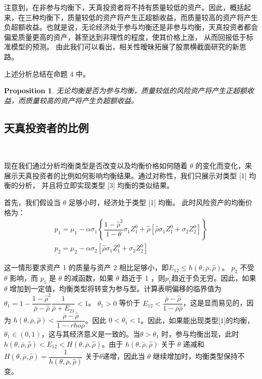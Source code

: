 \documentclass[10.0pt]{article}
\newtheorem{prop}{Proposition}
\begin{document}
注意到，在非参与均衡下，天真投资者将不持有质量较低的资产。因此，概括起来，在三种均衡下，质量较低的资产将产生正超额收益，而质量较高的资产将产生负超额收益。也就是说，无论经济处于参与均衡还是非参与均衡，天真投资者都会偏爱质量更高的资产，甚至达到非理性的程度，使其价格上涨， 从而回报低于标准模型的预测。 由此我们可以看出，相关性暧昧拓展了股票横截面研究的新思路。

上述分析总结在命题 4 中。
\begin{prop}
无论均衡是否为参与均衡，质量较低的风险资产将产生正超额收益，而质量较高的资产将产生负超额收益。
\end{prop}

\subsection{天真投资者的比例}

\quad \ 


现在我们通过分析均衡类型是否改变以及均衡价格如何随着 $ \theta $ 的变化而变化，来展示天真投资者的比例如何影响均衡结果。通过对称性，我们只展示对类型 [1] 均衡的分析， 并且将立即实现类型 [3] 均衡的类似结果。



首先，我们假设当 $ \theta $ 足够小时，经济处于类型 [1] 均衡。 此时风险资产的均衡价格为：
\begin{eqnarray*}
& p_1 = \mu_1 - \alpha \sigma_1 \left\{ \dfrac{1 - {\hat \rho}^2}{1 - \theta} \sigma_1 Z_1^0 + {\hat \rho} \left[ {\hat \rho} \sigma_1 Z_1^0 + \sigma_2 Z_2^0 \right] \right\} & \\
& p_2 = \mu_2 - \alpha \sigma_2 \left[ {\hat \rho} \sigma_1 Z_1^0 + \sigma_2 Z_2^0 \right] &
\end{eqnarray*}


这一情形要求资产 1 的质量与资产 2 相比足够小，即$ E_{1 2} \leqslant h (\theta, \overline{\rho}, {\hat \rho}) $。 $ p_2 $ 不受 $ \theta $ 影响，而 $ p_1 $ 是 $ \theta $ 的减函数，如果 $ \theta $ 趋近于 1 ，则$p_1$趋近于负无穷。因此，如果 $ \theta $ 增加到一定值，均衡类型将转变为参与型。计算表明偏移的临界值为 $ \theta_1 = 1 - \dfrac{1 - {\hat \rho}^2}{\overline{\rho} - {\hat \rho}} \dfrac{1 }{{\hat \rho} + E_{2 1}} < 1 $。 $ \theta_1 > 0 $ 等价于 $ E_{1 2} < \dfrac{\overline{\rho} - {\hat \rho}}{1 - \overline{\rho} {\hat \rho}} $，这是显而易见的，因为 $ h (\theta, \overline{\rho}, {\hat \rho}) < \dfrac{\overline{\rho} - {\hat \rho}}{1 - {\hat \ rho} \overline{\rho}} $。因此 $ 0 < \theta_1 < 1 $。因此，如果能出现类型[1]的均衡，$\theta_1\in(0, 1)$，这与其经济意义是一致的。当$ \theta > \theta_1 $ 时，参与均衡出现，此时$ h (\theta, \overline{\rho}, {\hat \rho}) < E_{1 2} < H (\theta, \overline{\rho}, {\hat \rho}) $。由于 $ h (\theta, \overline{\rho}, {\hat \rho}) $ 关于 $ \theta $ 递减和 $ H (\theta, \overline{\rho}, {\hat \rho}) = \dfrac{1}{h (\theta, \overline{\rho}, {\hat \rho})} $ 关于$\theta$递增，因此当 $ \theta $ 继续增加时，均衡类型保持不变。
\end{document}
